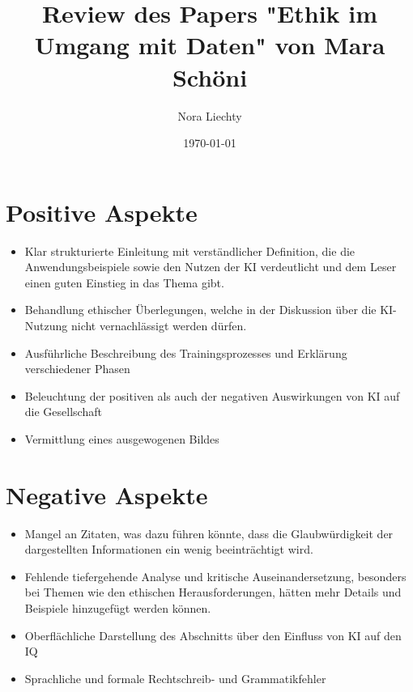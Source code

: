 \documentclass{article}
\title{Review des Papers "Ethik im Umgang mit Daten" von Mara Schöni}
\author{Nora Liechty}
\date{\today}
\begin{document}
\maketitle


\section{Positive Aspekte}

\begin{itemize}

    \item Klar strukturierte Einleitung mit verständlicher Definition, die die Anwendungsbeispiele sowie den Nutzen der KI verdeutlicht und dem Leser einen guten Einstieg in das Thema gibt. 
    \item Behandlung ethischer Überlegungen, welche in der Diskussion über die KI-Nutzung nicht vernachlässigt werden dürfen. 
    \item Ausführliche Beschreibung des Trainingsprozesses und Erklärung verschiedener Phasen
    \item Beleuchtung der positiven als auch der negativen Auswirkungen von KI auf die Gesellschaft
    \item Vermittlung eines ausgewogenen Bildes 
    
\end{itemize}

\section{Negative Aspekte}

\begin{itemize}

    \item Mangel an Zitaten, was dazu führen könnte, dass die Glaubwürdigkeit der dargestellten Informationen ein wenig beeinträchtigt wird. 
    \item Fehlende tiefergehende Analyse und kritische Auseinandersetzung, besonders bei Themen wie den ethischen Herausforderungen, hätten mehr Details und Beispiele hinzugefügt werden können. 
    \item Oberflächliche Darstellung des Abschnitts über den Einfluss von KI auf den IQ
    \item Sprachliche und formale Rechtschreib- und Grammatikfehler 
    
\end{itemize}
\end{document}
